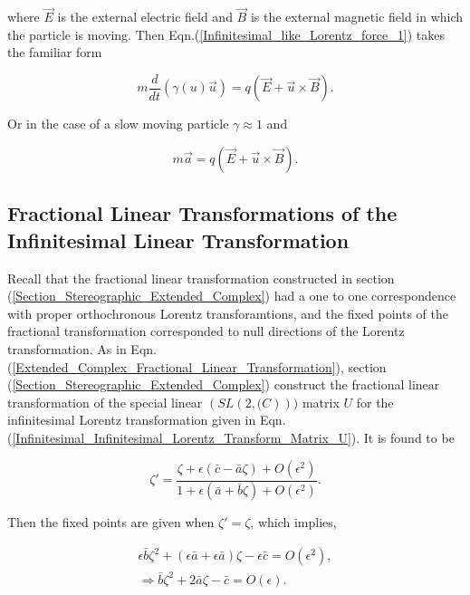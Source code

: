 \noindent where $\vec{E}$ is the external electric field and $\vec{B}$ is the external magnetic field in which the particle is moving. Then Eqn.(\ref{Infinitesimal_like_Lorentz_force_1}) takes the familiar form

\begin{equation*}
m \frac{d}{dt} (\gamma(u) \vec{u}) = q(\vec{E} + \vec{u} \times \vec{B}).
\end{equation*}

\noindent Or in the case of a slow moving particle $\gamma \approx 1$ and 

\begin{equation*}  
m \vec{a} = q (\vec{E} + \vec{u} \times \vec{B}).
\end{equation*}  

\subsection{Fractional Linear Transformations of the Infinitesimal Linear Transformation}\label{Infinitesimal_Section_Fractional_Linear}

Recall that the fractional linear transformation constructed in section (\ref{Section_Stereographic_Extended_Complex}) had a one to one correspondence with proper orthochronous Lorentz transforamtions, and the fixed points of the fractional transformation corresponded to null directions of the Lorentz transformation. As in Eqn.(\ref{Extended_Complex_Fractional_Linear_Transformation}), section (\ref{Section_Stereographic_Extended_Complex}) construct the fractional linear transformation of the special linear $(SL(2, \mathbb(C)))$ matrix $U$ for the infinitesimal Lorentz transformation given in Eqn.(\ref{Infinitesimal_Infinitesimal_Lorentz_Transform_Matrix_U}). It is found to be

\begin{equation*}   
\zeta' = \frac{\zeta + \epsilon(\bar{c} - \bar{a}\zeta) + O(\epsilon^2)}{1 + \epsilon(\bar{a} + \bar{b} \zeta) + O(\epsilon^2)}.
\end{equation*}

\noindent Then the fixed points are given when $\zeta' = \zeta$, which implies,

\begin{eqnarray}\nonumber
\epsilon \bar{b} \zeta^2 + (\epsilon \bar{a} + \epsilon \bar{a})\zeta - \epsilon \bar{c} = O(\epsilon^2), \\ \label{Infinitesimal_fixed_point_quadratic}
\Rightarrow \bar{b} \zeta^2 + 2 \bar{a} \zeta - \bar{c} = O(\epsilon).
\end{eqnarray}

